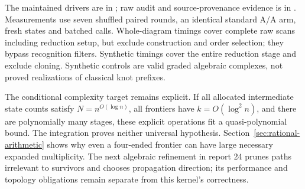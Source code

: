 The maintained drivers are in ; raw audit and
source-provenance evidence is in .
Measurements use seven shuffled paired rounds, an identical standard A/A arm,
fresh states and batched calls.  Whole-diagram timings cover complete raw scans
including reduction setup, but exclude construction and order selection;
they bypass recognition filters.  Synthetic timings cover the entire reduction
stage and exclude cloning.  Synthetic controls are valid graded algebraic
complexes, not proved realizations of classical knot prefixes.



The conditional complexity target remains explicit.  If all allocated
intermediate state counts satisfy $N=n^{O(\log n)}$, all frontiers have
$k=O(\log^2n)$, and there are polynomially many stages, these explicit
operations fit a quasi-polynomial bound.  The integration proves neither
universal hypothesis.  Section~\ref{sec:rational-arithmetic} shows why even a
four-ended frontier can have large necessary expanded multiplicity.  The next
algebraic refinement in report 24 prunes paths irrelevant to survivors and
chooses propagation direction; its performance and topology obligations
remain separate from this kernel's correctness.
